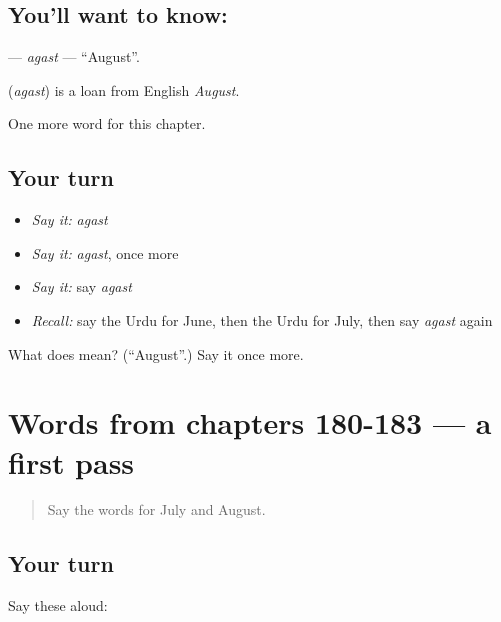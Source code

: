 \subsection*{You'll want to know: }
\textbf{} — \emph{agast} — \textquotedblleft{}August\textquotedblright{}.

\begin{cousinweb}
\textbf{} (\emph{agast}) is a loan from English \emph{August}.
\end{cousinweb}

\begin{grammarlens}[title={What you've built}]
One more word for this chapter.
\end{grammarlens}

\subsection*{Your turn}
\begin{itemize}
\raggedright
  \item \emph{Say it:} \emph{agast}
  \item \emph{Say it:} \emph{agast}, once more
  \item \emph{Say it:} say \emph{agast}
  \item \emph{Recall:} say the Urdu for June, then the Urdu for July, then say \emph{agast} again
\end{itemize}

\begin{tcolorbox}[breakable,colback=teal!4,colframe=teal!35!black,title={Before you move on}]
What does  mean? (\textquotedblleft{}August\textquotedblright{}.) Say it once more.
\end{tcolorbox}
\section[(dialogue)]{Words from chapters 180-183 — a first pass}

\label{lesson:UR-R188-first-pass-words-from-chapters-180-183}



\begin{quote}
Say the words for July and August.
\end{quote}

\subsection*{Your turn}
Say these aloud:

